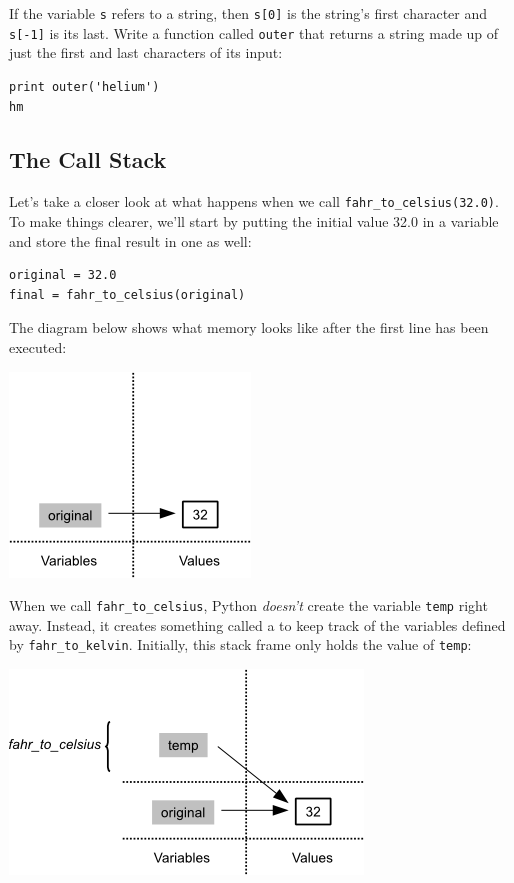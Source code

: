 \documentclass{book}
\begin{document}
\begin{challenge}
  If the variable \texttt{s} refers to a string, then \texttt{s{[}0{]}}
  is the string's first character and \texttt{s{[}-1{]}} is its last.
  Write a function called \texttt{outer} that returns a string made up
  of just the first and last characters of its input:

\begin{verbatim}
print outer('helium')
hm
\end{verbatim}
\end{challenge}

\subsection{The Call Stack}

Let's take a closer look at what happens when we call
\texttt{fahr\_to\_celsius(32.0)}. To make things clearer, we'll start by
putting the initial value 32.0 in a variable and store the final result
in one as well:

\begin{verbatim}
original = 32.0
final = fahr_to_celsius(original)
\end{verbatim}

The diagram below shows what memory looks like after the first line has
been executed:

\includegraphics{novice/python/img/python-call-stack-01.png}

When we call \texttt{fahr\_to\_celsius}, Python \emph{doesn't} create
the variable \texttt{temp} right away. Instead, it creates something
called a  to keep track of the
variables defined by \texttt{fahr\_to\_kelvin}. Initially, this stack
frame only holds the value of \texttt{temp}:

\includegraphics{novice/python/img/python-call-stack-02.png}
\end{document}
